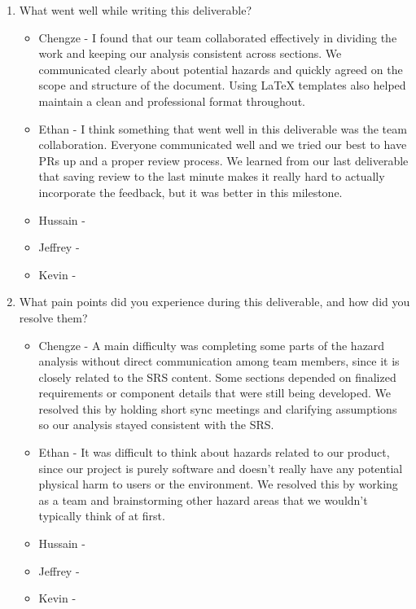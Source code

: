 \documentclass{article}
\begin{document}
\begin{enumerate}
    \item What went well while writing this deliverable? 
    \begin{itemize}
        \item Chengze - I found that our team collaborated effectively in dividing the work 
        and keeping our analysis consistent across sections. We communicated clearly about 
        potential hazards and quickly agreed on the scope and structure of the document. 
        Using LaTeX templates also helped maintain a clean and professional format throughout.
        \item Ethan - I think something that went well in this deliverable was
          the team collaboration. Everyone communicated well and we tried our
          best to have PRs up and a proper review process. We learned from our
          last deliverable that saving review to the last minute makes it
          really hard to actually incorporate the feedback, but it was better
          in this milestone.
        \item Hussain - 
        \item Jeffrey - 
        \item Kevin - 
    \end{itemize} 
    \item What pain points did you experience during this deliverable, and how
    did you resolve them?
    \begin{itemize}
        \item Chengze - A main difficulty was completing some parts of the hazard analysis 
        without direct communication among team members, since it is closely related to the 
        SRS content. Some sections depended on finalized requirements or component details 
        that were still being developed. We resolved this by holding short sync meetings and 
        clarifying assumptions so our analysis stayed consistent with the SRS.
        \item Ethan - It was difficult to think about hazards related to our
          product, since our project is purely software and doesn't really have
          any potential physical harm to users or the environment. We resolved
          this by working as a team and brainstorming other hazard areas that
          we wouldn't typically think of at first.
        \item Hussain - 
        \item Jeffrey - 
        \item Kevin - 

\end{itemize}
\end{enumerate}
\end{document}
